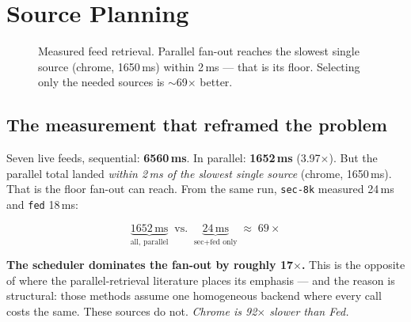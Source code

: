 \documentclass[10pt,twocolumn]{article}
\newcommand{\code}[1]{\texttt{\small #1}}
\begin{document}
\section{Source Planning}
\label{sec:planner}

\begin{figure}[t]
\centering
{}
\caption{Measured feed retrieval. Parallel fan-out reaches the slowest single source
(chrome, 1650\,ms) within 2\,ms --- that is its floor. Selecting only the needed sources
is $\sim$69$\times$ better.}
\label{fig:planner}
\end{figure}

\subsection{The measurement that reframed the problem}

Seven live feeds, sequential: \textbf{6560\,ms}. In parallel: \textbf{1652\,ms}
(3.97$\times$). But the parallel total landed \emph{within 2\,ms of the slowest single
source} (chrome, 1650\,ms). That is the floor fan-out can reach. From the same run,
\code{sec-8k} measured 24\,ms and \code{fed} 18\,ms:

\[
\underbrace{1652\,\text{ms}}_{\text{all, parallel}}
\;\;\text{vs.}\;\;
\underbrace{24\,\text{ms}}_{\text{sec+fed only}}
\;\approx\; 69\times
\]

\textbf{The scheduler dominates the fan-out by roughly 17$\times$.} This is the opposite
of where the parallel-retrieval literature places its emphasis --- and the reason is
structural: those methods assume one homogeneous backend where every call costs the same.
These sources do not. \emph{Chrome is 92$\times$ slower than Fed.}
\end{document}
